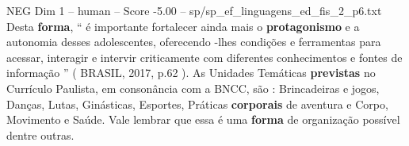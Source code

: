 \begin{textsample}{NEG Dim 1 – human – Score -5.00 – sp/sp\_ef\_linguagens\_ed\_fis\_2\_p6.txt}  \label{ex:f1_neg_020}
Desta \textbf{forma}, “ é importante fortalecer ainda mais o \textbf{protagonismo} e a autonomia desses adolescentes, oferecendo -lhes condições e ferramentas para acessar, interagir e intervir criticamente com diferentes conhecimentos e fontes de informação ” ( BRASIL, 2017, p.62 ).
As Unidades Temáticas \textbf{previstas} no Currículo Paulista, em consonância com a BNCC, são : Brincadeiras e jogos, Danças, Lutas, Ginásticas, Esportes, Práticas \textbf{corporais} de aventura e Corpo, Movimento e Saúde.
Vale lembrar que essa é uma \textbf{forma} de organização possível dentre outras.

\end{textsample}
